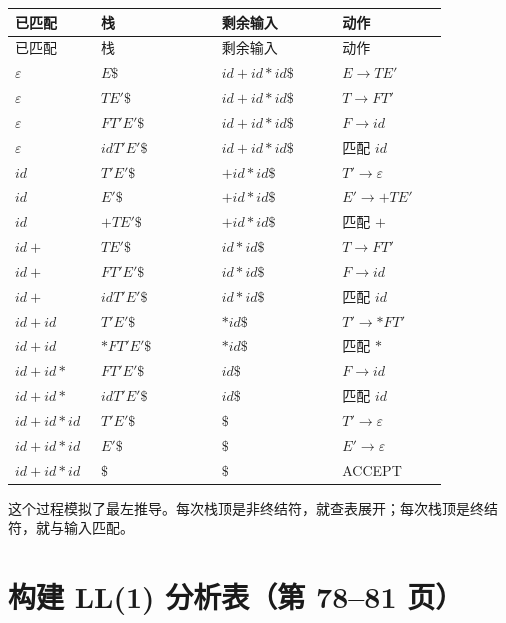 \documentclass[UTF8,fontset=none,11pt]{ctexart}
\newcommand{\eps}{\varepsilon}
\begin{document}
\begin{longtable}{p{0.14\linewidth}p{0.25\linewidth}p{0.25\linewidth}p{0.22\linewidth}}
\toprule
已匹配 & 栈 & 剩余输入 & 动作 \\
\midrule
\endfirsthead
\toprule
已匹配 & 栈 & 剩余输入 & 动作 \\
\midrule
\endhead
\(\eps\) & \(E\$\) & \(id+id*id\$\) & \(E\to TE'\)\\
\(\eps\) & \(TE'\$\) & \(id+id*id\$\) & \(T\to FT'\)\\
\(\eps\) & \(FT'E'\$\) & \(id+id*id\$\) & \(F\to id\)\\
\(\eps\) & \(idT'E'\$\) & \(id+id*id\$\) & 匹配 \(id\)\\
\(id\) & \(T'E'\$\) & \(+id*id\$\) & \(T'\to\eps\)\\
\(id\) & \(E'\$\) & \(+id*id\$\) & \(E'\to +TE'\)\\
\(id\) & \(+TE'\$\) & \(+id*id\$\) & 匹配 \(+\)\\
\(id+\) & \(TE'\$\) & \(id*id\$\) & \(T\to FT'\)\\
\(id+\) & \(FT'E'\$\) & \(id*id\$\) & \(F\to id\)\\
\(id+\) & \(idT'E'\$\) & \(id*id\$\) & 匹配 \(id\)\\
\(id+id\) & \(T'E'\$\) & \(*id\$\) & \(T'\to *FT'\)\\
\(id+id\) & \(*FT'E'\$\) & \(*id\$\) & 匹配 \(*\)\\
\(id+id*\) & \(FT'E'\$\) & \(id\$\) & \(F\to id\)\\
\(id+id*\) & \(idT'E'\$\) & \(id\$\) & 匹配 \(id\)\\
\(id+id*id\) & \(T'E'\$\) & \(\$\) & \(T'\to\eps\)\\
\(id+id*id\) & \(E'\$\) & \(\$\) & \(E'\to\eps\)\\
\(id+id*id\) & \(\$\) & \(\$\) & ACCEPT\\
\bottomrule
\end{longtable}

这个过程模拟了最左推导。每次栈顶是非终结符，就查表展开；每次栈顶是终结符，就与输入匹配。

\section{构建 LL(1) 分析表（第 78--81 页）}
\end{document}
